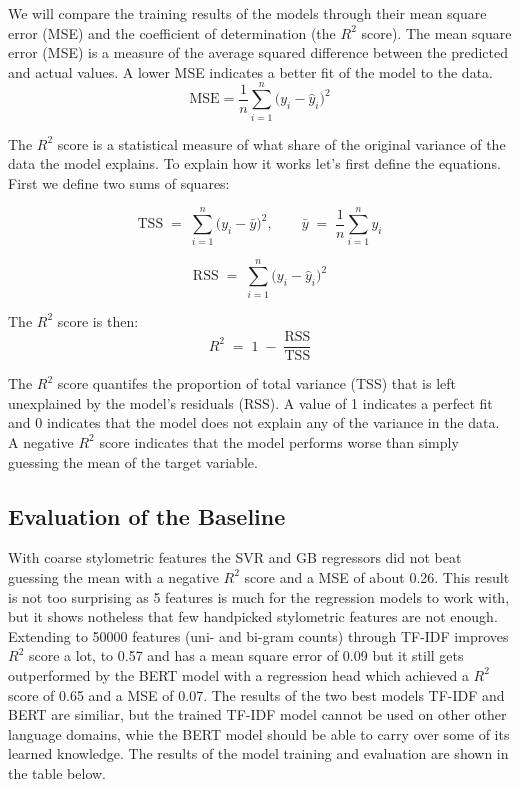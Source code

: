 \documentclass[twoside]{ctuthesis}
\theoremstyle{plain}
\theoremstyle{definition}
\theoremstyle{note}
\begin{document}
We will compare the training results of the models through their mean square error (MSE) and the coefficient of determination (the $R^2$ score). The mean square error (MSE) is a measure of the average squared difference between the predicted and actual values. A lower MSE indicates a better fit of the model to the data. 
\begin{equation}
	\mathrm{MSE} = \frac{1}{n}\sum_{i=1}^{n}\bigl(y_i - \hat{y}_i\bigr)^2
\end{equation}

The $R^2$ score is a statistical measure of what share of the original variance of the data the model explains. To explain how it works let's first define the equations. First we define two sums of squares:\par
\begin{equation}
	\mathrm{TSS} \;=\; \sum_{i=1}^{n} \bigl(y_i - \bar{y}\bigr)^2,
	\qquad
	\bar{y} \;=\; \frac{1}{n}\sum_{i=1}^{n} y_i
\end{equation}


\begin{equation}
	\mathrm{RSS} \;=\; \sum_{i=1}^{n} \bigl(y_i - \hat{y}_i\bigr)^2
\end{equation}

The $R^2$ score is then:
\begin{equation}
	R^{2} \;=\; 1 \;-\; \frac{\mathrm{RSS}}{\mathrm{TSS}}
\end{equation}

The $R^2$ score quantifes the proportion of total variance (TSS) that is left unexplained by the model's residuals (RSS).  A value of 1 indicates a perfect fit and 0 indicates that the model does not explain any of the variance in the data. A negative $R^2$ score indicates that the model performs worse than simply guessing the mean of the target variable.\par

\subsection{Evaluation of the Baseline}
With coarse stylometric features the SVR and GB regressors did not beat guessing the mean with a negative $R^2$ score and a MSE of about 0.26. This result is not too surprising as 5 features is much for the regression models to work with, but it shows notheless that few handpicked stylometric features are not enough. Extending to 50000 features (uni- and bi-gram counts) through TF-IDF improves $R^2$ score a lot, to 0.57 and has a mean square error of 0.09 but it still gets outperformed by the BERT model with a regression head which achieved a $R^2$ score of 0.65 and a MSE of 0.07. The results of the two best models TF-IDF and BERT are similiar, but the trained TF-IDF model cannot be used on other other language domains, whie the BERT model should be able to carry over some of its learned knowledge. The results of the model training and evaluation are shown in the table below.\par
\end{document}
